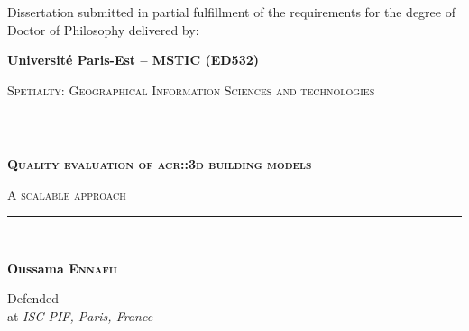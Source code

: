 
\begin{titlepage}
    \begin{center}
        \begin{small}
            Dissertation submitted in partial fulfillment of the requirements for the degree of Doctor of Philosophy delivered by:
        \end{small}

        \vspace*{5mm}

        \begin{Large}
            \textbf{Université Paris-Est -- MSTIC (ED532)}
        \end{Large}

        \vspace*{10mm}
        \begin{large}
            \textsc{Spetialty: Geographical Information Sciences and technologies}
        \end{large}

        \vspace*{15mm}

        \rule{\textwidth}{1.5pt}\\
        \begin{LARGE}
            \textsc{\textbf{Quality evaluation of \texorpdfstring{\acrshort*{acr::3d}}{3D} building models}}\\
        \end{LARGE}
        \vspace*{2.5mm}
        \begin{Large}
            \textsc{A scalable approach}
        \end{Large}
        \rule{\textwidth}{1.5pt}\\

        \vspace*{15mm}

        \begin{large}
            \textbf{Oussama \textsc{Ennafii}}
        \end{large}

        \vfill

        Defended \textit{} \\
        at \textit{ISC-PIF, Paris, France}

        \vfill


\end{center}
\end{titlepage}
